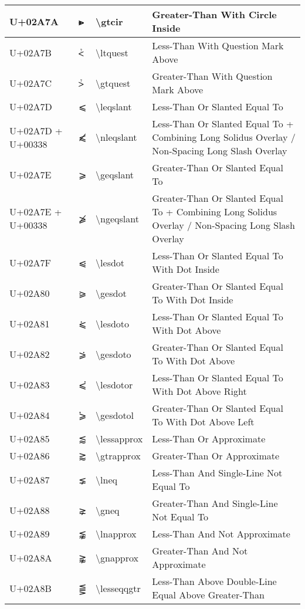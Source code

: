 \begin{table}[h]
\begin{tabulary}{\linewidth}{|L|L|L|L|}
\hline
U+02A7A & ⩺ & {\textbackslash}gtcir & Greater-Than With Circle Inside \\
\hline
U+02A7B & ⩻ & {\textbackslash}ltquest & Less-Than With Question Mark Above \\
\hline
U+02A7C & ⩼ & {\textbackslash}gtquest & Greater-Than With Question Mark Above \\
\hline
U+02A7D & ⩽ & {\textbackslash}leqslant & Less-Than Or Slanted Equal To \\
\hline
U+02A7D + U+00338 & ⩽̸ & {\textbackslash}nleqslant & Less-Than Or Slanted Equal To + Combining Long Solidus Overlay / Non-Spacing Long Slash Overlay \\
\hline
U+02A7E & ⩾ & {\textbackslash}geqslant & Greater-Than Or Slanted Equal To \\
\hline
U+02A7E + U+00338 & ⩾̸ & {\textbackslash}ngeqslant & Greater-Than Or Slanted Equal To + Combining Long Solidus Overlay / Non-Spacing Long Slash Overlay \\
\hline
U+02A7F & ⩿ & {\textbackslash}lesdot & Less-Than Or Slanted Equal To With Dot Inside \\
\hline
U+02A80 & ⪀ & {\textbackslash}gesdot & Greater-Than Or Slanted Equal To With Dot Inside \\
\hline
U+02A81 & ⪁ & {\textbackslash}lesdoto & Less-Than Or Slanted Equal To With Dot Above \\
\hline
U+02A82 & ⪂ & {\textbackslash}gesdoto & Greater-Than Or Slanted Equal To With Dot Above \\
\hline
U+02A83 & ⪃ & {\textbackslash}lesdotor & Less-Than Or Slanted Equal To With Dot Above Right \\
\hline
U+02A84 & ⪄ & {\textbackslash}gesdotol & Greater-Than Or Slanted Equal To With Dot Above Left \\
\hline
U+02A85 & ⪅ & {\textbackslash}lessapprox & Less-Than Or Approximate \\
\hline
U+02A86 & ⪆ & {\textbackslash}gtrapprox & Greater-Than Or Approximate \\
\hline
U+02A87 & ⪇ & {\textbackslash}lneq & Less-Than And Single-Line Not Equal To \\
\hline
U+02A88 & ⪈ & {\textbackslash}gneq & Greater-Than And Single-Line Not Equal To \\
\hline
U+02A89 & ⪉ & {\textbackslash}lnapprox & Less-Than And Not Approximate \\
\hline
U+02A8A & ⪊ & {\textbackslash}gnapprox & Greater-Than And Not Approximate \\
\hline
U+02A8B & ⪋ & {\textbackslash}lesseqqgtr & Less-Than Above Double-Line Equal Above Greater-Than \\

\end{tabulary}
\end{table}
